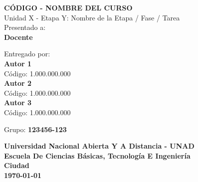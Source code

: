 \begin{titlepage}
	\begin{center}
		\Large
		\textbf{CÓDIGO - NOMBRE DEL CURSO}\\
		\vspace{0.5cm}
		Unidad X - Etapa Y: Nombre de la Etapa / Fase / Tarea\\
		\vspace{1cm}
		Presentado a:\\
		\vspace{0.3cm}
		\Large
		\textbf{Docente}\\	
		\vspace{0.5cm}

		\vfill

		\large
		Entregado por:\\
		\vspace{0.3cm}
		\Large
		\textbf{Autor 1}\\
		\vspace{0.2cm}
		\large	
		Código: 1.000.000.000\\
		\vspace{0.3cm}
		\Large
		\textbf{Autor 2}\\
		\vspace{0.2cm}
		\large	
		Código: 1.000.000.000\\
		\vspace{0.3cm}
		\Large
		\textbf{Autor 3}\\
		\vspace{0.2cm}
		\large	
		Código: 1.000.000.000\\
		\vspace{0.3cm}
		\vspace{1cm}

		Grupo: \textbf{123456-123}\\
		\vspace{1.0cm}

		\vfill

		\Large
		\textbf{Universidad Nacional Abierta Y A Distancia - UNAD}\\
		\vspace{0.3cm}
		\large
		\textbf{Escuela De Ciencias Básicas, Tecnología E Ingeniería}\\
		\vspace{0.3cm}
		\textbf{Ciudad}\\
		\vspace{0.3cm}
		\textbf{\today}
		\pagebreak

	\end{center}	
\end{titlepage}
